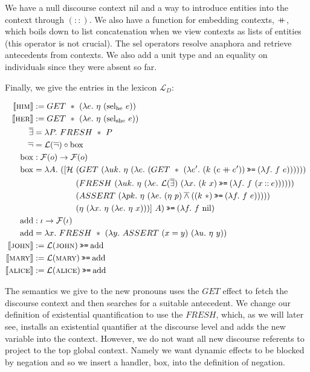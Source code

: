 \documentclass{article}
\newcommand{\hsbind}{\mathbin{\texttt{>>=}}}
\newcommand{\cons}{\mathbin{::}}
\newcommand{\cat}{\mathbin{+\mkern-10mu+}}
\newcommand{\abs}[1]{\textsc{#1}}
\newcommand{\sem}[1]{\llbracket #1 \rrbracket}
\newcommand{\lex}[2]{\sem{\abs{#1}} &:= #2}
\newcommand{\dand}{\mathbin{\overline{\land}}}
\newcommand{\dnot}{\mathop{\overline{\lnot}}}
\newcommand{\dexists}{\mathop{\overline{\exists}}}
\begin{document}
We have a null discourse context $\mathrm{nil}$ and a way to
introduce entities into the context through $(\cons)$. We also have a
function for embedding contexts, $\cat$, which boils down to list
concatenation when we view contexts as lists of entities (this operator is
not crucial). The $\mathrm{sel}$ operators resolve anaphora and
retrieve antecedents from contexts. We also add a unit type and an equality
on individuals since they were absent so far.

Finally, we give the entries in the lexicon $\mathcal{L}_D$:

\begin{align*}
  \lex{him}{GET\ *\ (\lambda e.\ \eta\ (\mathrm{sel_{he}}\ e))} \\
  \lex{her}{GET\ *\ (\lambda e.\ \eta\ (\mathrm{sel_{she}}\ e))} \\
  \dexists &= \lambda P.\ FRESH\ *\ P \\
  \dnot &= \mathcal{L}(\dnot) \circ \mathrm{box} \\
  \mathrm{box} &: \mathcal{F}(o) \to \mathcal{F}(o) \\
  \mathrm{box} &= \lambda A.\ ([\mathcal{H}\ 
      (GET\ (\lambda u k.\ \eta\ (\lambda e.\ (GET\ *\ (\lambda e'.\ (k\ (e \cat e')) \hsbind (\lambda f.\ f\ e))))))\ \\
    & \hskip 1.8cm (FRESH\ (\lambda u k.\ \eta\ (\lambda e.\ \mathcal{L}(\dexists)\ (\lambda x.\ (k\ x) \hsbind (\lambda f.\ f\ (x \cons e))))))\ \\
    & \hskip 1.8cm (ASSERT\ (\lambda p k.\ \eta\ (\lambda e.\ (\eta\ p) \dand ((k\ *) \hsbind (\lambda f.\ f\ e)))))\ \\
    & \hskip 1.8cm (\eta\ (\lambda x.\ \eta\ (\lambda e.\ \eta\ x)))]\ A) \hsbind (\lambda f.\ f\ \mathrm{nil}) \\
  \mathrm{add} &: \iota \to \mathcal{F}(\iota) \\
  \mathrm{add} &= \lambda x.\ FRESH\ *\ (\lambda y.\ ASSERT\ (x = y)\ (\lambda u.\ \eta\ y)) \\
  \lex{john}{\mathcal{L}(\abs{john}) \hsbind \mathrm{add}} \\
  \lex{mary}{\mathcal{L}(\abs{mary}) \hsbind \mathrm{add}} \\
  \lex{alice}{\mathcal{L}(\abs{alice}) \hsbind \mathrm{add}} \\
\end{align*}

The semantics we give to the new pronouns uses the $GET$ effect to fetch
the discourse context and then searches for a suitable antecedent. We
change our definition of existential quantification to use the $FRESH$,
which, as we will later see, installs an existential quantifier at the
discourse level and adds the new variable into the context. However, we do
not want all new discourse referents to project to the top global
context. Namely we want dynamic effects to be blocked by negation and so we
insert a handler, $\mathrm{box}$, into the definition of negation.
\end{document}
